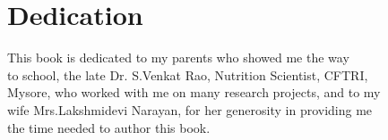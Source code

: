 
\chapter*{Dedication}

\begin{center}
This book is dedicated to my parents who showed me the 
 way\\ to school, the late Dr. S.Venkat Rao, Nutrition Scientist, CFTRI,\\ Mysore, who worked with me on many research projects, and to my\\ wife Mrs.Lakshmidevi Narayan, for her generosity in providing me\\ the time needed to author this book.
\end{center}

